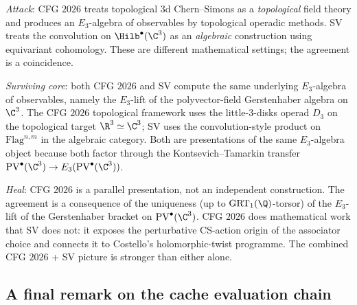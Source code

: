\begin{remark}
\label{rem:cycle-5-attack-heal-wave10}
\emph{Attack}: CFG $2026$ treats topological $3$d Chern--Simons as
a \emph{topological} field theory and produces an $E_3$-algebra of
observables by topological operadic methods. SV treats the convolution
on $\Hilb^\bullet(\C^3)$ as an \emph{algebraic} construction using
equivariant cohomology. These are different mathematical settings;
the agreement is a coincidence.

\emph{Surviving core}: both CFG $2026$ and SV compute the same
underlying $E_3$-algebra of observables, namely the $E_3$-lift of the
polyvector-field Gerstenhaber algebra on $\C^3$. The CFG $2026$
topological framework uses the little-$3$-disks operad $D_3$ on the
topological target $\R^3 \simeq \C^3$; SV uses the convolution-style
product on $\mathrm{Flag}^{n, m}$ in the algebraic category. Both are
presentations of the same $E_3$-algebra object because both factor
through the Kontsevich--Tamarkin transfer $\mathrm{PV}^\bullet(\C^3)
\to E_3(\mathrm{PV}^\bullet(\C^3))$.

\emph{Heal}: CFG $2026$ is a parallel presentation, not an independent
construction. The agreement is a consequence of the uniqueness
(up to $\mathrm{GRT}_1(\Q)$-torsor) of the $E_3$-lift of the Gerstenhaber
bracket on $\mathrm{PV}^\bullet(\C^3)$. CFG $2026$ does mathematical
work that SV does not: it exposes the perturbative CS-action origin of
the associator choice and connects it to Costello's holomorphic-twist
programme. The combined CFG $2026$ + SV picture is stronger than either
alone.
\end{remark}

\subsection*{A final remark on the cache evaluation chain}

